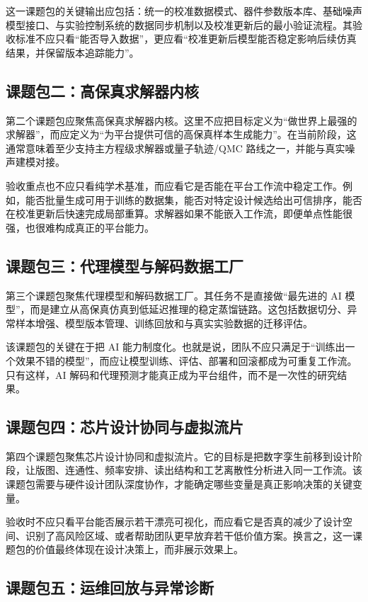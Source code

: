 \documentclass[11pt,a4paper]{article}
\begin{document}
这一课题包的关键输出应包括：统一的校准数据模式、器件参数版本库、基础噪声模型接口、与实验控制系统的数据同步机制以及校准更新后的最小验证流程。其验收标准不应只看“能否导入数据”，更应看“校准更新后模型能否稳定影响后续仿真结果，并保留版本追踪能力”。

\subsection{课题包二：高保真求解器内核}

第二个课题包应聚焦高保真求解器内核。这里不应把目标定义为“做世界上最强的求解器”，而应定义为“为平台提供可信的高保真样本生成能力”。在当前阶段，这通常意味着至少支持主方程级求解器或量子轨迹/QMC 路线之一，并能与真实噪声建模对接。

验收重点也不应只看纯学术基准，而应看它是否能在平台工作流中稳定工作。例如，能否批量生成可用于训练的数据集，能否对特定设计候选给出可信排序，能否在校准更新后快速完成局部重算。求解器如果不能嵌入工作流，即便单点性能很强，也很难构成真正的平台能力。

\subsection{课题包三：代理模型与解码数据工厂}

第三个课题包聚焦代理模型和解码数据工厂。其任务不是直接做“最先进的 AI 模型”，而是建立从高保真仿真到低延迟推理的稳定蒸馏链路。这包括数据切分、异常样本增强、模型版本管理、训练回放和与真实实验数据的迁移评估。

该课题包的关键在于把 AI 能力制度化。也就是说，团队不应只满足于“训练出一个效果不错的模型”，而应让模型训练、评估、部署和回滚都成为可重复工作流。只有这样，AI 解码和代理预测才能真正成为平台组件，而不是一次性的研究结果。

\subsection{课题包四：芯片设计协同与虚拟流片}

第四个课题包聚焦芯片设计协同和虚拟流片。它的目标是把数字孪生前移到设计阶段，让版图、连通性、频率安排、读出结构和工艺离散性分析进入同一工作流。该课题包需要与硬件设计团队深度协作，才能确定哪些变量是真正影响决策的关键变量。

验收时不应只看平台能否展示若干漂亮可视化，而应看它是否真的减少了设计空间、识别了高风险区域、或者帮助团队更早放弃若干低价值方案。换言之，这一课题包的价值最终体现在设计决策上，而非展示效果上。

\subsection{课题包五：运维回放与异常诊断}
\end{document}
